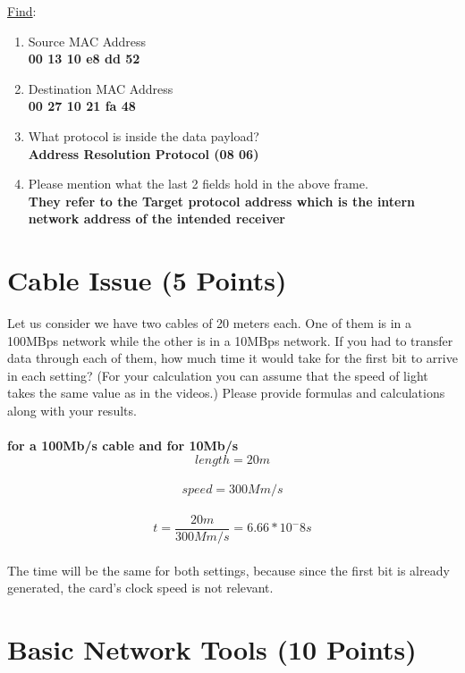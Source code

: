 \documentclass{WeSTassignment}
\begin{document}
\underline{Find}:
\begin{enumerate}https://preview.overleaf.com/public/tbgxycndjzvz/images/74ab5a56c5c8131ff3a69e3c44c58c47a5910407.jpeg
\item Source MAC Address \\
\textbf{00 13 10 e8 dd 52}
\item Destination MAC Address \\
\textbf{00 27 10 21 fa 48}
\item What protocol is inside the data payload? \\
\textbf{Address Resolution Protocol (08 06)}
\item Please mention what the last 2 fields hold in the above frame. \\
\textbf{They refer to the Target protocol address which is the intern network address of the intended receiver}
\end{enumerate}



\section{Cable Issue (5 Points)}

Let us consider we have two cables of 20 meters each. One of them is in a 100MBps network while the other is in a 10MBps network. If you had to transfer data through each of them, how much time it would take for the first bit to arrive in each setting? (For your calculation you can assume that the speed of light takes the same value as in the videos.) Please provide formulas and calculations along with your results. \\
\\ \textbf{for a 100Mb/s cable and for 10Mb/s}
\[length = 20 m\] \\
\[speed  = 300M m/s\] \\
\[t  = \frac{20m}{300M m/s} = 6.66*10^-8 s\] \\

The time will be the same for both settings, because since the first bit is already generated, the card's clock speed is not relevant.



\section{Basic Network Tools (10 Points)}
\end{document}
